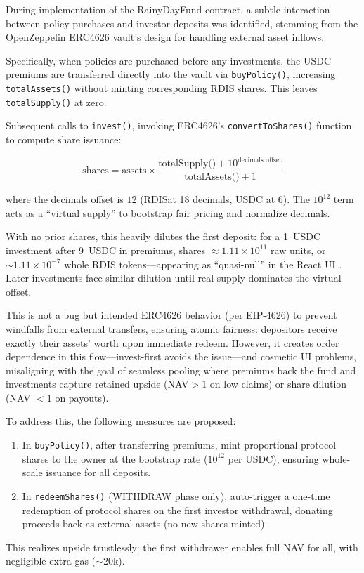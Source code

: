 \documentclass[11pt,a4paper]{article}
\begin{document}
        During implementation of the RainyDayFund contract, a subtle interaction between policy purchases and investor deposits was identified, stemming from the OpenZeppelin ERC4626 vault's design for handling external asset inflows.

        Specifically, when policies are purchased before any investments, the USDC premiums are transferred directly into the vault via \texttt{buyPolicy()}, increasing \texttt{totalAssets()} without minting corresponding RDIS shares.
        This leaves \texttt{totalSupply()} at zero.

        Subsequent calls to \texttt{invest()}, invoking ERC4626's \texttt{convertToShares()} function to compute share issuance:

        \[
        \text{shares} = \text{assets} \times \frac{\text{totalSupply()} + 10^{\text{decimals offset}}}{\text{totalAssets()} + 1}
        \]

        where the decimals offset is $12$ (RDIS\footnotemark at 18 decimals, USDC at 6). 
        The $10^{12}$ term acts as a ``virtual supply'' to bootstrap fair pricing and normalize decimals.

        With no prior shares, this heavily dilutes the first deposit: for a 1~USDC investment after 9~USDC in premiums, shares $\approx 1.11 \times 10^{11}$ raw units, or $\sim 1.11 \times 10^{-7}$ whole RDIS tokens---appearing as ``quasi-null'' in the React UI .
        Later investments face similar dilution until real supply dominates the virtual offset.

        This is not a bug but intended ERC4626 behavior (per EIP-4626\footnotemark) to prevent windfalls from external transfers, ensuring atomic fairness: depositors receive exactly their assets' worth upon immediate redeem. 
        However, it creates order dependence in this flow---invest-first avoids the issue---and cosmetic UI problems, misaligning with the goal of seamless pooling where premiums back the fund and investments capture retained upside (NAV\footnotemark $> 1$ on low claims) or share dilution (NAV $< 1$ on payouts). 

        To address this, the following measures are proposed:
        \begin{enumerate}
        \item In \texttt{buyPolicy()}, after transferring premiums, mint proportional protocol shares to the owner at the bootstrap rate ($10^{12}$ per USDC), ensuring whole-scale issuance for all deposits.
        \item In \texttt{redeemShares()} (WITHDRAW phase only), auto-trigger a one-time redemption of protocol shares on the first investor withdrawal, donating proceeds back as external assets (no new shares minted).
        \end{enumerate}
        This realizes upside trustlessly: the first withdrawer enables full NAV for all, with negligible extra gas ($\sim$20k).
\end{document}
